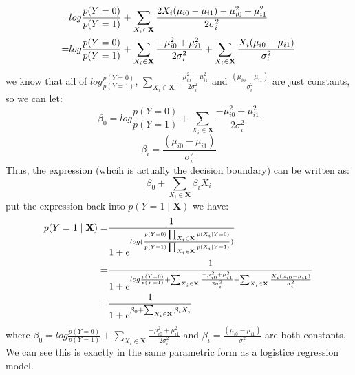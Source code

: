 \documentclass[11pt]{article}
\renewcommand{\vec}[1]{\mathbf{#1}}
\begin{document}
\begin{enumerate}
\begin{answertext}{15cm}{}
\end{answertext}
\begin{answertext}{18cm}{}
\begin{align}
=& log\frac{p(Y=0)}{p(Y=1)} + \sum_{X_i \in \vec{X}}\frac{ 2 X_i (\mu_{i0} - \mu_{i1}) - \mu_{i0}^2  + \mu_{i1}^2}{2\sigma_{i}^2}\notag \\
=& log\frac{p(Y=0)}{p(Y=1)} + \sum_{X_i \in \vec{X}} \frac{ - \mu_{i0}^2  + \mu_{i1}^2}{2\sigma_{i}^2}+ \sum_{X_i \in \vec{X}}\frac{ X_i (\mu_{i0} - \mu_{i1})}{\sigma_{i}^2}\notag
\end{align}
we know that all of $log\frac{p(Y=0)}{p(Y=1)}$, $ \sum_{X_i \in \vec{X}} \frac{ - \mu_{i0}^2  + \mu_{i1}^2}{2\sigma_{i}^2}$ and $\frac{  (\mu_{i0} - \mu_{i1})}{\sigma_{i}^2}$ are just constants, so we can let:
$$\beta_0 = log\frac{p(Y=0)}{p(Y=1)} + \sum_{X_i \in \vec{X}} \frac{ - \mu_{i0}^2  + \mu_{i1}^2}{2\sigma_{i}^2}$$
$$\beta_i = \frac{  (\mu_{i0} - \mu_{i1})}{\sigma_{i}^2}$$
Thus, the expression (whcih is actually the decision boundary) can be written as:
$$\beta_0 + \sum_{X_i \in \vec{X}}\beta_i X_i$$
put the expression back into $p(Y = 1 \mid \vec{X})$ we have:
\begin{align}
p(Y = 1 \mid \vec{X}) = &\frac{1}{1+ e^{log(\frac{p(Y=0) \prod_{X_i \in \vec{X}} p(X_i \mid Y=0)}{p(Y=1) \prod_{X_i \in \vec{X}} p(X_i \mid Y=1)})}} \notag\\
= & \frac{1}{1+ e^{log\frac{p(Y=0)}{p(Y=1)} + \sum_{X_i \in \vec{X}} \frac{ - \mu_{i0}^2  + \mu_{i1}^2}{2\sigma_{i}^2}+ \sum_{X_i \in \vec{X}}\frac{ X_i (\mu_{i0} - \mu_{i1})}{\sigma_{i}^2}}} \notag\\
= & \frac{1}{1+ e^{\beta_0 + \sum_{X_i \in \vec{X}}\beta_i X_i}} \notag
\end{align}
where $\beta_0 = log\frac{p(Y=0)}{p(Y=1)} + \sum_{X_i \in \vec{X}} \frac{ - \mu_{i0}^2  + \mu_{i1}^2}{2\sigma_{i}^2}$ and
$\beta_i = \frac{  (\mu_{i0} - \mu_{i1})}{\sigma_{i}^2}$ are both constants.\\
We can see this is exactly in the same parametric form as a logistice regression model.
\end{answertext}
\end{enumerate}
\end{document}
